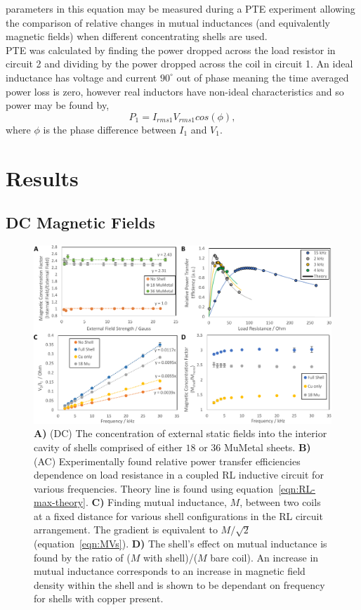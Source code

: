 \documentclass[11pt]{iopart}
\begin{document}
parameters in this equation may be measured during a PTE experiment
allowing the comparison of relative changes in mutual inductances (and
equivalently magnetic fields) when different concentrating shells are
used. \\
PTE was calculated by finding the power dropped across the load
resistor in circuit 2 and dividing by the power dropped across the
coil in circuit 1. An ideal inductance has voltage and current
$90^\circ$ out of phase meaning the time averaged power loss is zero,
however real inductors have non-ideal characteristics and so power may
be found by,
\begin{equation}
    P_1 = I_{rms1}V_{rms1}cos(\phi),
\label{eqn:P1}
\end{equation}
where $\phi$ is the phase difference between $I_1$ and $V_1$.

\section{Results}
\subsection{DC Magnetic Fields}

\begin{figure}
  \begin{center}
   \noindent\includegraphics[width=\linewidth]{images/compoundRL.pdf}
  \end{center}
  \caption{
    \textbf{A)} (DC) The concentration of external static fields into
    the interior cavity of shells comprised of either $18$ or $36$
    MuMetal sheets.
    \textbf{B)} (AC) Experimentally found relative power transfer
    efficiencies dependence on load resistance in a coupled RL
    inductive circuit for various frequencies. Theory line is found
    using equation~\ref{eqn:RL-max-theory}.
    \textbf{C)} Finding mutual inductance, $M$, between two coils at a
    fixed distance for various shell configurations in the RL circuit
    arrangement.  The gradient is equivalent to $M/\sqrt{2}$
    (equation~\ref{eqn:MVs}).
    \textbf{D)} The shell's effect on mutual inductance is found by the
    ratio of ($M$ with shell)/($M$ bare coil). An increase in mutual
    inductance corresponds to an increase in magnetic field density
    within the shell and is shown to be dependant on frequency for
    shells with copper present.}
  \label{fig:DC_RL}
\end{figure}
\end{document}
